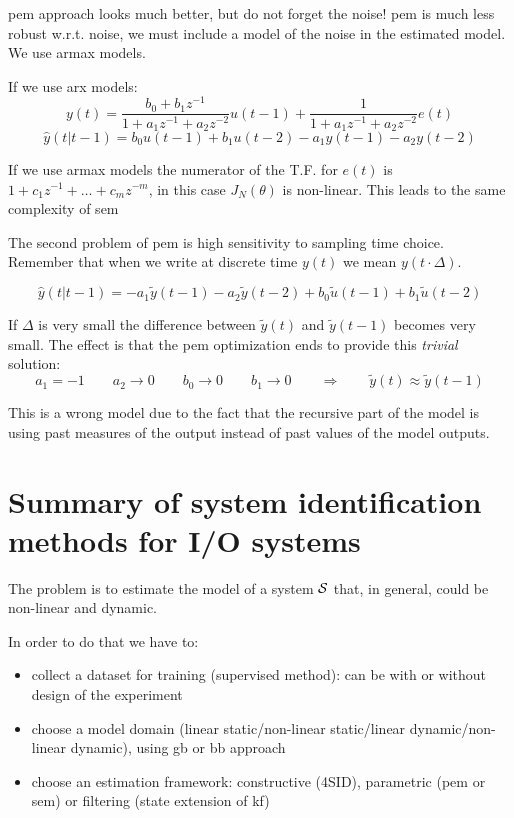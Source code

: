 \gls{pem} approach looks much better, but do not forget the noise! \gls{pem} is much less robust w.r.t. noise, we must include a model of the noise in the estimated model.
We use \gls{armax} models.

If we use \gls{arx} models:
\[
    y(t) = \frac{b_0+b_1z^{-1}}{1+a_1z^{-1}+a_2z^{-2}}u(t-1) + \frac{1}{1+a_1z^{-1}+a_2z^{-2}}e(t)
\]
\[
    \hat{y}(t|t-1) = b_0u(t-1)+b_1u(t-2) - a_1y(t-1)-a_2y(t-2)
\]

If we use \gls{armax} models the numerator of the T.F. for $e(t)$ is $1+c_1z^{-1}+\ldots+c_mz^{-m}$, in this case $J_N(\theta)$ is non-linear.
This leads to the same complexity of \gls{sem}

The second problem of \gls{pem} is high sensitivity to sampling time choice.
Remember that when we write at discrete time $y(t)$ we mean $y(t\cdot \Delta)$.

\[
    \hat{y}(t|t-1) = -a_1\tilde{y}(t-1)-a_2\tilde{y}(t-2) + b_0\tilde{u}(t-1)+b_1\tilde{u}(t-2)
\]

If $\Delta$ is very small the difference between $\tilde{y}(t)$ and $\tilde{y}(t-1)$ becomes very small.
The effect is that the \gls{pem} optimization ends to provide this \emph{trivial} solution:
\[
    a_1 = -1 \qquad a_2 \rightarrow 0 \qquad b_0 \rightarrow 0 \qquad b_1 \rightarrow 0 \qquad \Rightarrow \qquad \tilde{y}(t) \approx \tilde{y}(t-1)
\]

This is a wrong model due to the fact that the recursive part of the model is using past measures of the output instead of past values of the model outputs.

\section{Summary of system identification methods for I/O systems}

The problem is to estimate the model of a system $\mathcal{S}$ that, in general, could be non-linear and dynamic.
\begin{figure}[H]
    \centering
\end{figure}

In order to do that we have to:
\begin{itemize}
    \item collect a dataset for training (supervised method): can be with or without design of the experiment
    \item choose a model domain (linear static/non-linear static/linear dynamic/non-linear dynamic), using \gls{gb} or \gls{bb} approach
    \item choose an estimation framework: constructive (4SID), parametric (\gls{pem} or \gls{sem}) or filtering (state extension of \gls{kf})
\end{itemize}


